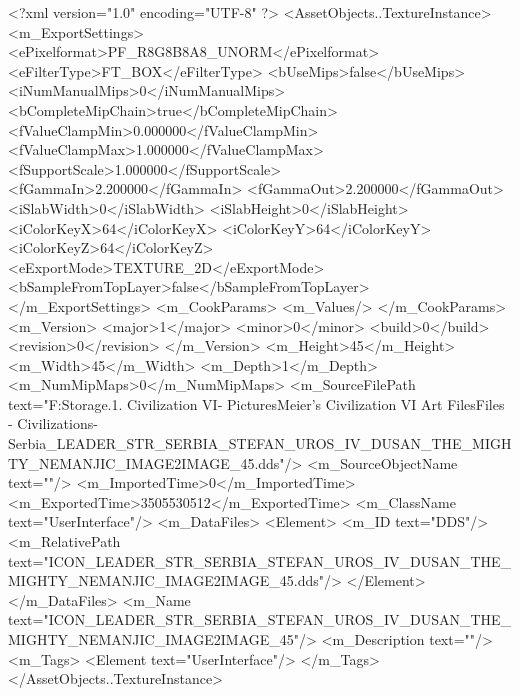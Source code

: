 <?xml version="1.0" encoding="UTF-8" ?>
<AssetObjects..TextureInstance>
	<m_ExportSettings>
		<ePixelformat>PF_R8G8B8A8_UNORM</ePixelformat>
		<eFilterType>FT_BOX</eFilterType>
		<bUseMips>false</bUseMips>
		<iNumManualMips>0</iNumManualMips>
		<bCompleteMipChain>true</bCompleteMipChain>
		<fValueClampMin>0.000000</fValueClampMin>
		<fValueClampMax>1.000000</fValueClampMax>
		<fSupportScale>1.000000</fSupportScale>
		<fGammaIn>2.200000</fGammaIn>
		<fGammaOut>2.200000</fGammaOut>
		<iSlabWidth>0</iSlabWidth>
		<iSlabHeight>0</iSlabHeight>
		<iColorKeyX>64</iColorKeyX>
		<iColorKeyY>64</iColorKeyY>
		<iColorKeyZ>64</iColorKeyZ>
		<eExportMode>TEXTURE_2D</eExportMode>
		<bSampleFromTopLayer>false</bSampleFromTopLayer>
	</m_ExportSettings>
	<m_CookParams>
		<m_Values/>
	</m_CookParams>
	<m_Version>
		<major>1</major>
		<minor>0</minor>
		<build>0</build>
		<revision>0</revision>
	</m_Version>
	<m_Height>45</m_Height>
	<m_Width>45</m_Width>
	<m_Depth>1</m_Depth>
	<m_NumMipMaps>0</m_NumMipMaps>
	<m_SourceFilePath text="F:\Mod Storage\2.1. Civilization VI\Mods\Archive - Pictures\Sid Meier's Civilization VI Art Files\Art Files - Civilizations\Civilization - Serbia\ICON_LEADER_STR_SERBIA_STEFAN_UROS_IV_DUSAN_THE_MIGHTY_NEMANJIC_IMAGE2IMAGE_45.dds"/>
	<m_SourceObjectName text=""/>
	<m_ImportedTime>0</m_ImportedTime>
	<m_ExportedTime>3505530512</m_ExportedTime>
	<m_ClassName text="UserInterface"/>
	<m_DataFiles>
		<Element>
			<m_ID text="DDS"/>
			<m_RelativePath text="ICON_LEADER_STR_SERBIA_STEFAN_UROS_IV_DUSAN_THE_MIGHTY_NEMANJIC_IMAGE2IMAGE_45.dds"/>
		</Element>
	</m_DataFiles>
	<m_Name text="ICON_LEADER_STR_SERBIA_STEFAN_UROS_IV_DUSAN_THE_MIGHTY_NEMANJIC_IMAGE2IMAGE_45"/>
	<m_Description text=""/>
	<m_Tags>
		<Element text="UserInterface"/>
	</m_Tags>
</AssetObjects..TextureInstance>

